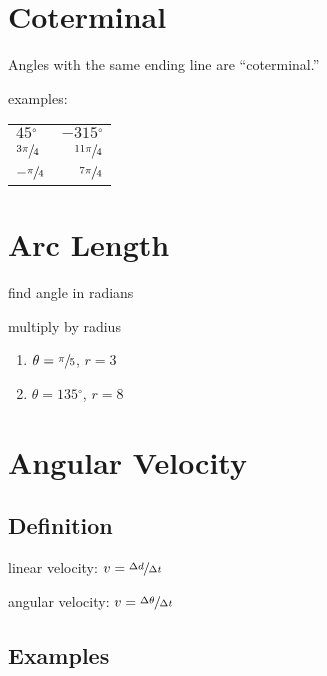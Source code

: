 \documentclass{exam}
\newcommand{\dg}{\ensuremath{^\circ}}
\begin{document}
  \section{Coterminal}
  Angles with the same ending line are ``coterminal.''

  examples:
  \begin{tabular}[H]{lr}
    $45 \dg$             & $-315 \dg$ \\
    $\sfrac{3 \pi}{4}$   & $\sfrac{11 \pi}{4}$ \\
    $- \sfrac{\pi}{4}$   & $\sfrac{7 \pi}{4}$ \\
  \end{tabular}

  \section{Arc Length}

  \begin{itemize*}
    \item find angle in radians
    \item multiply by radius
  \end{itemize*}

  \begin{enumerate}
    \item $\theta = \sfrac{\pi}{5}$, $r = 3$
    \item $\theta = 135 \dg$, $r = 8$
  \end{enumerate}

  \section{Angular Velocity}

  \subsection{Definition}
  \begin{itemize*}
    \item linear velocity: $v = \sfrac{\Delta d}{\Delta t}$
    \item angular velocity: $v = \sfrac{\Delta \theta}{\Delta t}$
  \end{itemize*}

  \subsection{Examples}
\end{document}
